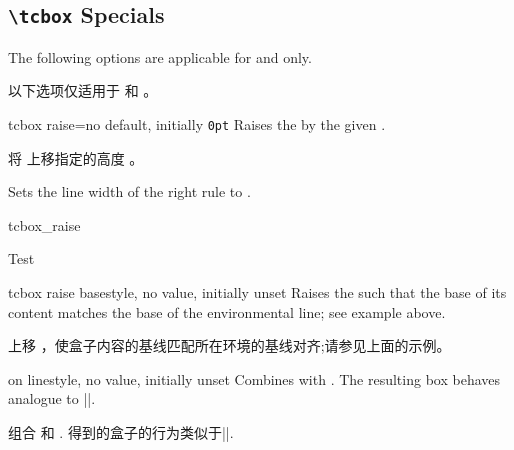 \subsection{\texttt{\textbackslash tcbox} Specials}

The following options are applicable for  and 
only.

以下选项仅适用于  和 。
\begin{docTcbKey}{tcbox raise}{=}{no default, initially \texttt{0pt}}
Raises the  by the given .

将  上移指定的高度 。

Sets the line width of the right rule to .
\begin{exdispExample}{tcbox_raise}

Test\dotfill
{}\dotfill
{}\dotfill
{}
\end{exdispExample}
\end{docTcbKey}


\begin{docTcbKey}{tcbox raise base}{}{style, no value, initially unset}
Raises the  such that the base of its content matches
the base of the environmental line; see example above.

上移  ，使盒子内容的基线匹配所在环境的基线对齐;请参见上面的示例。
\end{docTcbKey}

\begin{docTcbKey}{on line}{}{style, no value, initially unset}
Combines  with .
The resulting box behaves analogue to |\fbox|.

组合  和 .
得到的盒子的行为类似于|\fbox|.
\end{docTcbKey}




